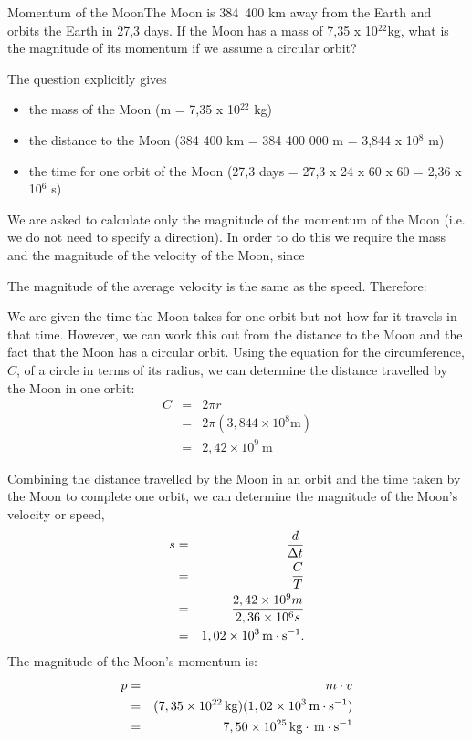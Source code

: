 \begin{wex}{Momentum of the Moon}{The Moon is 384~400 km away from the Earth and orbits the Earth in 27,3 days. If the Moon has a mass of 7,35 x 10$^{22}$kg, what is the magnitude of its momentum if we assume a circular orbit?}{ The question explicitly gives
\begin{itemize}
\item the mass of the Moon (m = 7,35 x 10$^{22}$ kg)
\item the distance to the Moon (384 400 km = 384 400 000 m = 3,844 x 10$^8$ m)
\item the time for one orbit of the Moon (27,3 days = 27,3 x 24 x 60 x 60 = 2,36 x 10$^6$ s)
\end{itemize}

We are asked to calculate only the magnitude of the momentum of the Moon (i.e.\@{} we do not need to specify a direction). In order to do this we require the mass and the magnitude of the velocity of the Moon, since

The magnitude of the average velocity is the same as the speed. Therefore:

We are given the time the Moon takes for one orbit but not how far it travels in that time. However, we can work this out from the distance to the Moon and the fact that the Moon has a circular orbit. Using the equation for the circumference, $C$, of a circle in terms of its radius, we can determine the distance travelled by the Moon in one
orbit:
\begin{eqnarray*}
C&=&2\pi r\\
&=&2\pi (3,844\times10^8 \mathrm{m})\\
&=& 2,42\times10^{9}\ \mathrm{m}
\end{eqnarray*}

Combining the distance travelled by the Moon in an orbit and the time
taken by the Moon to complete one orbit, we can determine the
magnitude of the Moon's velocity or speed,
\begin{eqnarray*}
s &=& \frac{d}{\Delta t}\\
&=& \frac{C}{T}\\
&=& \frac{2,42 \times 10^9 m}{2,36 \times 10^6 s}\\
&=& 1,02\times 10^{3}\,\mathrm{m \cdot s^{-1}}.
\end{eqnarray*}
The magnitude of the Moon's momentum is:
\begin{eqnarray*}
p &=& m \cdot v\\
&=& (7,35\times 10^{22} \,\mathrm{kg})(1,02\times 10^{3} \,\mathrm{m \cdot s^{-1}})\\
&=& 7,50 \times 10^{25}\,\mathrm{kg} \cdot \,\mathrm{m \cdot s^{-1}}
\end{eqnarray*}}
\end{wex}

